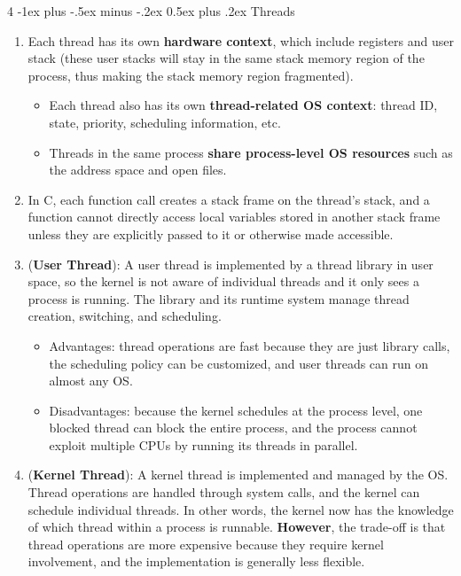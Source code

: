 \documentclass[10pt, landscape]{article}
\makeatletter
\renewcommand{\section}{\@startsection{section}{1}{0mm}%
                                {-1ex plus -.5ex minus -.2ex}%
                                {0.5ex plus .2ex}%
                                {\normalfont\large\bfseries}}
\makeatother
\begin{document}
\begin{multicols}{4}
\section{Threads}
\begin{enumerate}
    \item Each thread has its own \textbf{hardware context}, which include registers and user stack (these user stacks will stay in the same stack memory region of the process, thus making the stack memory region fragmented).
    \begin{itemize}
        \item Each thread also has its own \textbf{thread-related OS context}: thread ID, state, priority, scheduling information, etc.
        \item Threads in the same process \textbf{share process-level OS resources} such as the address space and open files.
    \end{itemize}
    \item In C, each function call creates a stack frame on the thread's stack, and a function cannot directly access local variables stored in another stack frame unless they are explicitly passed to it or otherwise made accessible.
    \item (\textbf{User Thread}): A user thread is implemented by a thread library in user space, so the kernel is not aware of individual threads and it only sees a process is running. The library and its runtime system manage thread creation, switching, and scheduling.
    \begin{itemize}
        \item Advantages: thread operations are fast because they are just library calls, the scheduling policy can be customized, and user threads can run on almost any OS.
        \item Disadvantages: because the kernel schedules at the process level, one blocked thread can block the entire process, and the process cannot exploit multiple CPUs by running its threads in parallel.
    \end{itemize}
    \item (\textbf{Kernel Thread}): A kernel thread is implemented and managed by the OS. Thread operations are handled through system calls, and the kernel can schedule individual threads. In other words, the kernel now has the knowledge of which thread within a process is runnable. \textbf{However}, the trade-off is that thread operations are more expensive because they require kernel involvement, and the implementation is generally less flexible.

\end{enumerate}
\end{multicols}
\end{document}
